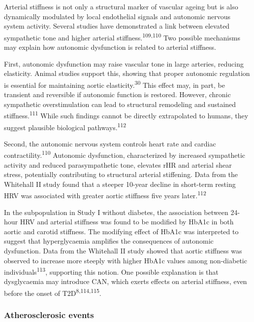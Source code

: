 \documentclass[
  a4paper,
  headsepline=true,
  open=left]{scrbook}
\begin{document}
Arterial stiffness is not only a structural marker of vascular ageing
but is also dynamically modulated by local endothelial signals and
autonomic nervous system activity. Several studies have demonstrated a
link between elevated sympathetic tone and higher arterial
stiffness.\textsuperscript{109,110} Two possible mechanisms may explain
how autonomic dysfunction is related to arterial stiffness.

First, autonomic dysfunction may raise vascular tone in large arteries,
reducing elasticity. Animal studies support this, showing that proper
autonomic regulation is essential for maintaining aortic
elasticity.\textsuperscript{30} This effect may, in part, be transient
and reversible if autonomic function is restored. However, chronic
sympathetic overstimulation can lead to structural remodeling and
sustained stiffness.\textsuperscript{111} While such findings cannot be
directly extrapolated to humans, they suggest plausible biological
pathways.\textsuperscript{112}

Second, the autonomic nervous system controls heart rate and cardiac
contractility.\textsuperscript{110} Autonomic dysfunction, characterized
by increased sympathetic activity and reduced parasympathetic tone,
elevates rHR and arterial shear stress, potentially contributing to
structural arterial stiffening. Data from the Whitehall II study found
that a steeper 10-year decline in short-term resting HRV was associated
with greater aortic stiffness five years later.\textsuperscript{112}

In the subpopulation in Study I without diabetes, the association
between 24-hour HRV and arterial stiffness was found to be modified by
HbA1c in both aortic and carotid stiffness. The modifying effect of
HbA1c was interpreted to suggest that hyperglycaemia amplifies the
consequences of autonomic dysfunction. Data from the Whitehall II study
showed that aortic stiffness was observed to increase more steeply with
higher HbA1c values among non-diabetic individuals\textsuperscript{113},
supporting this notion. One possible explanation is that dysglycaemia
may introduce CAN, which exerts effects on arterial stiffness, even
before the onset of T2D\textsuperscript{8,114,115}.

\hypertarget{atherosclerosic-events}{%
\subsubsection{Atherosclerosic events}\label{atherosclerosic-events}}
\end{document}
